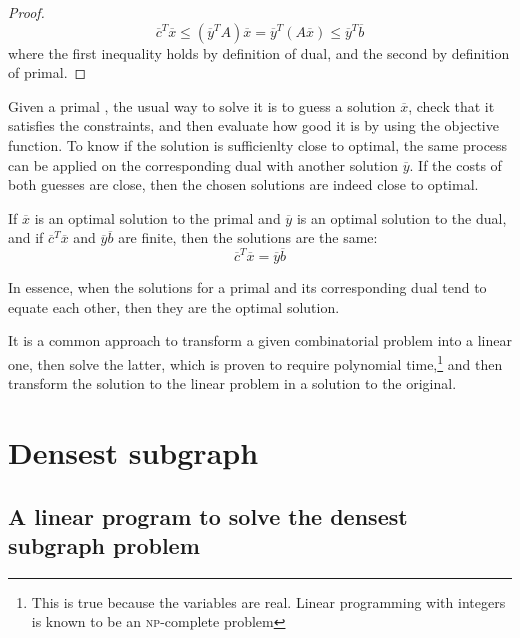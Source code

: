 \begin{proof}
    \[
        \overline{c}^T \overline{x} \leq (\overline{y}^T A)\overline{x} = \overline{y}^T (A \overline{x}) \leq \overline{y}^T \overline{b}
    \]
    where the first inequality holds by definition of dual, and the second by definition of primal.
\end{proof}

Given a primal \lp{}, the usual way to solve it is to guess a solution $\overline{x}$, check that it satisfies the constraints, and then evaluate how good it is by using the objective function. To know if the solution is sufficienlty close to optimal, the same process can be applied on the corresponding dual \lp{} with another solution $\overline{y}$. If the costs of both guesses are close, then the chosen solutions are indeed close to optimal.

\begin{theorem}\label{thm:strong-duality}
    If $\overline{x}$ is an optimal solution to the primal and $\overline{y}$ is an optimal solution to the dual, and if $\overline{c}^T \overline{x}$ and $\overline{y} \overline{b}$ are finite, then the solutions are the same:
    \begin{equation}
        \overline{c}^T \overline{x} = \overline{y} \overline{b}
    \end{equation}
\end{theorem}

In essence, when the solutions for a primal and its corresponding dual tend to equate each other, then they are the optimal solution.

It is a common approach to transform a given combinatorial problem into a linear one, then solve the latter, which is proven to require polynomial time,\footnote{This is true because the variables are real. Linear programming with integers is known to be an \textsc{np}-complete problem} and then transform the solution to the linear problem in a solution to the original.


\section{Densest subgraph}\label{sec:densest-subgraph}

\subsection{A linear program to solve the densest subgraph problem} \label{sec:dsp-lp}

